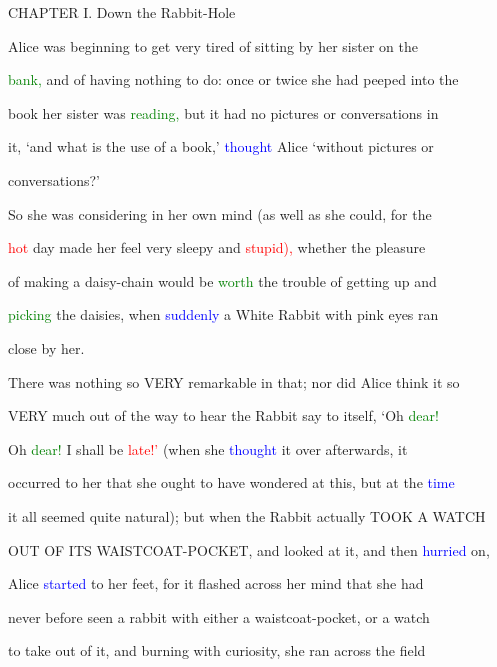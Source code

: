  CHAPTER I. Down the Rabbit-Hole



 Alice was beginning to get very tired of sitting by her sister on the

 \textcolor{green}{bank,} and of having nothing to do: once or twice she had peeped into the

 book her sister was \textcolor{green}{reading,} but it had no pictures or conversations in

 it, ‘and what is the use of a book,’ \textcolor{blue}{thought} Alice ‘without pictures or

 conversations?’



 So she was considering in her own mind (as well as she could, for the

 \textcolor{red}{hot} day made her feel very sleepy and \textcolor{red}{stupid),} whether the pleasure

 of making a daisy-chain would be \textcolor{green}{worth} the trouble of getting up and

 \textcolor{green}{picking} the daisies, when \textcolor{blue}{suddenly} a \textcolor{BurntOrange}{White} Rabbit with pink eyes ran

 close by her.



 There was nothing so VERY \textcolor{BurntOrange}{remarkable} in that; nor did Alice think it so

 VERY much out of the way to hear the Rabbit say to itself, ‘Oh \textcolor{green}{dear!}

 Oh \textcolor{green}{dear!} I shall be \textcolor{red}{late!’} (when she \textcolor{blue}{thought} it over afterwards, it

 occurred to her that she ought to have wondered at this, but at the \textcolor{blue}{time}

 it all seemed quite natural); but when the Rabbit actually TOOK A \textcolor{BurntOrange}{WATCH}

 OUT OF ITS WAISTCOAT-POCKET, and looked at it, and then \textcolor{blue}{hurried} on,

 Alice \textcolor{blue}{started} to her feet, for it flashed across her mind that she had

 never before seen a rabbit with either a waistcoat-pocket, or a \textcolor{BurntOrange}{watch}

 to take out of it, and burning with \textcolor{BurntOrange}{curiosity,} she ran across the field

